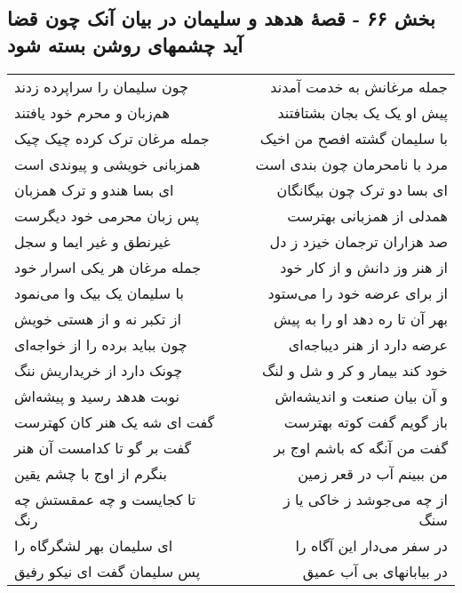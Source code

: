 \begin{center}
\section*{بخش ۶۶ - قصهٔ هدهد و سلیمان در بیان آنک چون قضا آید چشمهای روشن بسته شود}
\label{sec:sh066}
\begin{longtable}{l p{0.5cm} r}
چون سلیمان را سراپرده زدند
&&
جمله مرغانش به خدمت آمدند
\\
هم‌زبان و محرم خود یافتند
&&
پیش او یک یک بجان بشتافتند
\\
جمله مرغان ترک کرده چیک چیک
&&
با سلیمان گشته افصح من اخیک
\\
همزبانی خویشی و پیوندی است
&&
مرد با نامحرمان چون بندی است
\\
ای بسا هندو و ترک همزبان
&&
ای بسا دو ترک چون بیگانگان
\\
پس زبان محرمی خود دیگرست
&&
همدلی از همزبانی بهترست
\\
غیرنطق و غیر ایما و سجل
&&
صد هزاران ترجمان خیزد ز دل
\\
جمله مرغان هر یکی اسرار خود
&&
از هنر وز دانش و از کار خود
\\
با سلیمان یک بیک وا می‌نمود
&&
از برای عرضه خود را می‌ستود
\\
از تکبر نه و از هستی خویش
&&
بهر آن تا ره دهد او را به پیش
\\
چون بباید برده را از خواجه‌ای
&&
عرضه دارد از هنر دیباجه‌ای
\\
چونک دارد از خریداریش ننگ
&&
خود کند بیمار و کر و شل و لنگ
\\
نوبت هدهد رسید و پیشه‌اش
&&
و آن بیان صنعت و اندیشه‌اش
\\
گفت ای شه یک هنر کان کهترست
&&
باز گویم گفت کوته بهترست
\\
گفت بر گو تا کدامست آن هنر
&&
گفت من آنگه که باشم اوج بر
\\
بنگرم از اوج با چشم یقین
&&
من ببینم آب در قعر زمین
\\
تا کجایست و چه عمقستش چه رنگ
&&
از چه می‌جوشد ز خاکی یا ز سنگ
\\
ای سلیمان بهر لشگرگاه را
&&
در سفر می‌دار این آگاه را
\\
پس سلیمان گفت ای نیکو رفیق
&&
در بیابانهای بی آب عمیق
\\
\end{longtable}
\end{center}
